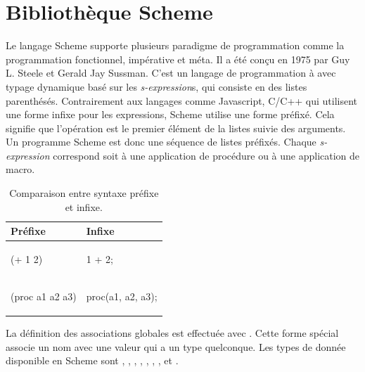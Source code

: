 
\chapter{Bibliothèque Scheme}
Le langage Scheme\cite{Scheme} supporte plusieurs paradigme de programmation
comme la programmation fonctionnel, impérative et méta. Il a été conçu en 1975
par Guy L. Steele et Gerald Jay Sussman. C'est un langage de programmation à
avec typage dynamique basé sur les \textit{s-expression}s, qui consiste en des listes
parenthésés. Contrairement aux langages comme Javascript, C/C++ qui utilisent une
forme infixe pour les expressions, Scheme utilise une forme préfixé. Cela
signifie que l'opération est le premier élément de la listes suivie des
arguments. Un programme Scheme est donc une séquence de listes préfixés.  Chaque
\textit{s-expression} correspond soit à une application de procédure ou à une
application de macro.

\begin{table}[htbp]
\begin{center}
\begin{tabular}{|l|l|}
  \hline
  \textbf{Préfixe}& \textbf{Infixe}\\\hline
  \begin{mplisting}{0.1}
(+ 1 2)
\end{mplisting}&
  \begin{mplisting}{0.1}
1 + 2;
\end{mplisting}\\
\hline
  \begin{mplisting}{0.25}
(proc a1 a2 a3)
\end{mplisting}&
  \begin{mplisting}{0.25}
proc(a1, a2, a3);
\end{mplisting}\\
\hline
\end{tabular}
\end{center}
  \caption{Comparaison entre syntaxe préfixe et infixe.}
\end{table}

La définition des associations globales est effectuée avec .  Cette
forme spécial associe un nom avec une valeur qui a un type quelconque.  Les types de
donnée disponible en Scheme sont , ,
, , , ,
,  et .

